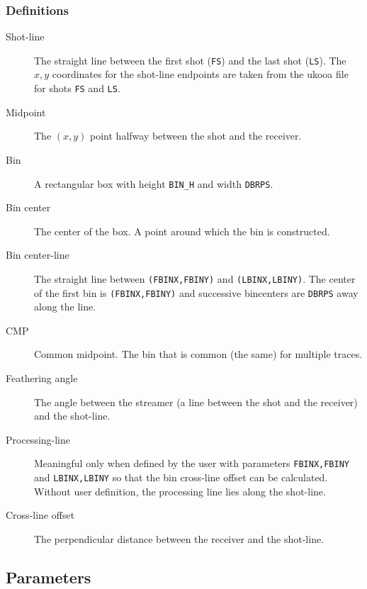 \subsubsection{Definitions}
\begin{description}
    \item[Shot-line] The straight line between the first \gls{shot} (\texttt{FS}) and the last \gls{shot} (\texttt{LS}).  The $x,y$ coordinates for the shot-line endpoints are taken from the \gls{ukooa} file for \glspl{shot} \texttt{FS} and \texttt{LS}.
    \item[Midpoint] The $(x,y)$ point halfway between the \gls{shot} and the receiver.
    \item[Bin] A rectangular box with height \texttt{BIN\_H} and width \texttt{DBRPS}.
    \item[Bin center] The center of the box.  A point around which the bin is constructed.
    \item[Bin center-line] The straight line between \texttt{(FBINX,FBINY)} and \texttt{(LBINX,LBINY)}.  The center of the first bin is \texttt{(FBINX,FBINY)} and successive bincenters are \texttt{DBRPS} away along the line.
    \item[CMP] Common midpoint. The bin that is common (the same) for multiple traces.
    \item[Feathering angle] The angle between the streamer (a line between the \gls{shot} and the receiver) and the shot-line.
    \item[Processing-line] Meaningful only when defined by the user with parameters \texttt{FBINX,FBINY} and \texttt{LBINX,LBINY} so that the bin cross-line offset can be calculated.  Without user definition, the processing line lies along the shot-line.
    \item[Cross-line offset] The perpendicular distance between the receiver and the shot-line.
\end{description}

\subsection{Parameters}


